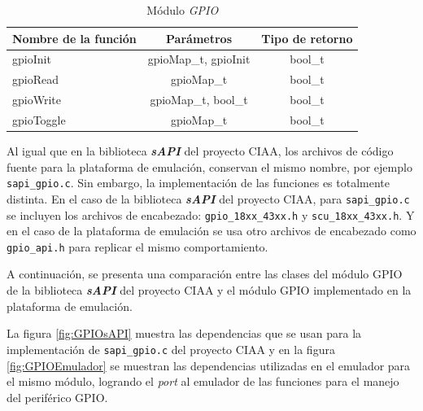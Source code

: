 \begin{table}[h]
	\centering
	\caption[Módulo \textit{GPIO}]{Módulo \textit{GPIO}}
	\begin{tabular}{l c c}    
		\toprule
		\textbf{Nombre de la función} 	 & \textbf{Parámetros} 		& \textbf{Tipo de retorno}  \\
		\midrule
		gpioInit & gpioMap\_t, gpioInit				&  bool\_t \\		
		gpioRead	 & gpioMap\_t				&  bool\_t \\
		gpioWrite	 & gpioMap\_t, bool\_t				&  bool\_t \\
		gpioToggle	 & gpioMap\_t				&  bool\_t \\
		\bottomrule
		\hline
	\end{tabular}
	\label{tab:gpioMap}
\end{table}



Al igual que en la biblioteca \textit{\textbf{sAPI}} del proyecto CIAA, los archivos de código fuente para la plataforma de emulación, conservan el mismo nombre, por ejemplo  \texttt{sapi\_gpio.c}. Sin embargo, la implementación de las funciones es totalmente distinta. En el caso de la biblioteca \textit{\textbf{sAPI}} del proyecto CIAA, para \texttt{sapi\_gpio.c}  se incluyen los archivos de encabezado: \texttt{gpio\_18xx\_43xx.h} y \newline \texttt{scu\_18xx\_43xx.h}. Y en el caso de la plataforma de emulación se usa otro archivos de encabezado como \texttt{gpio\_api.h} para replicar el mismo comportamiento.

A continuación, se presenta una comparación entre las clases del módulo GPIO de la biblioteca \textit{\textbf{sAPI}} del proyecto CIAA y el módulo GPIO implementado en la plataforma de emulación. 

La figura \ref{fig:GPIOsAPI} muestra las dependencias que se usan para la implementación de \newline \texttt{sapi\_gpio.c} del proyecto CIAA y en la figura \ref{fig:GPIOEmulador} se muestran las dependencias utilizadas en el emulador para el mismo módulo, logrando el \textit{port} al emulador de las funciones para el manejo del periférico GPIO.




